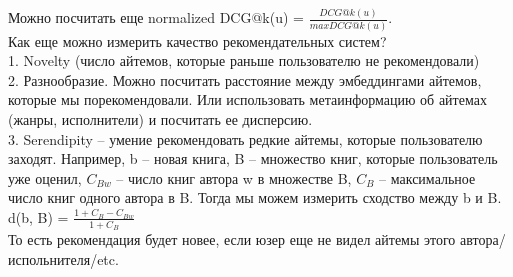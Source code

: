Можно посчитать еще normalized DCG@k(u) = $\frac{DCG@k(u)}{maxDCG@k(u)}$. \\

Как еще можно измерить качество рекомендательных систем? \\ 
1. Novelty (число айтемов, которые раньше пользователю не рекомендовали) \\ 
2. Разнообразие. Можно посчитать расстояние между эмбеддингами айтемов, которые мы порекомендовали. Или использовать метаинформацию об айтемах (жанры, исполнители) и посчитать ее дисперсию. \\ 
3. Serendipity -- умение рекомендовать редкие айтемы, которые пользователю заходят. Например, b -- новая книга, B -- множество книг, которые пользователь уже оценил, $C_{Bw}$ -- число книг автора w в множестве B, $C_{B}$ -- максимальное число книг одного автора в B. Тогда мы можем измерить сходство между b и B. \\ 
d(b, B) = $\frac{1 + C_{B} - C_{Bw}}{1 + C_{B}}$ \\ 
То есть рекомендация будет новее, если юзер еще не видел айтемы этого автора/испольнителя/etc.
